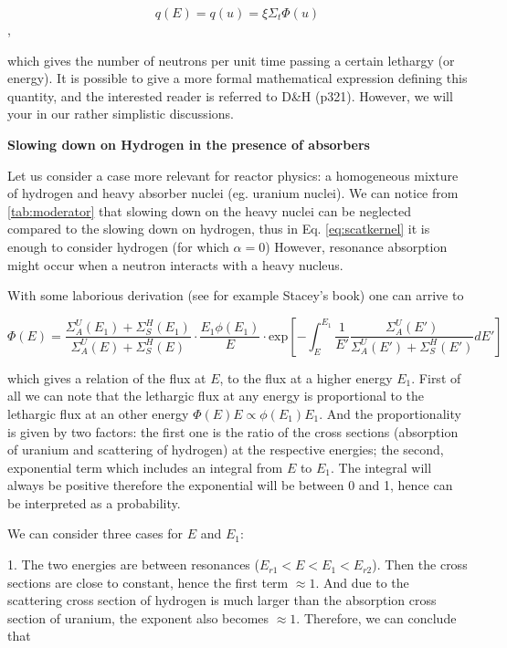 $$q(E)=q(u)=\xi\Sigma_t\Phi(u)$$,

which gives the number of neutrons per unit time passing a certain lethargy (or energy). It is possible to give a more formal mathematical expression defining this quantity, and the interested reader is referred to D\&H (p321). However, we will your in our rather simplistic discussions.


\vspace{0.5cm}

\textbf{Slowing down on Hydrogen in the presence of absorbers}

Let us consider a case more relevant for reactor physics: a homogeneous mixture of hydrogen and heavy absorber nuclei (eg. uranium nuclei). We can notice from \autoref{tab:moderator} that slowing down on the heavy nuclei can be neglected compared to the slowing down on hydrogen, thus in Eq. \eqref{eq:scatkernel} it is enough to consider hydrogen (for which $\alpha=0$) However, resonance absorption might occur when a neutron interacts with a heavy nucleus. 

With some laborious derivation (see for example Stacey's book) one can arrive to

\begin{equation}\label{eq:slowingdownHU}
 \Phi(E) = \frac{\Sigma_A^U(E_1) + \Sigma_S^H(E_1)}{ \Sigma_A^U(E) + \Sigma_S^H(E)} \cdot \frac{E_1\phi(E_1)}{E} \cdot \mathrm{exp}\left[-\int_E^{E_1} \frac{1}{E'} \frac{\Sigma_A^U(E')}{\Sigma_A^U(E') + \Sigma_S^H(E')}dE'\right]
\end{equation}

\noindent which gives a relation of the flux at $E$, to the flux at a higher energy $E_1$. First of all we can note that the lethargic flux at any energy is proportional to the lethargic flux at an other energy $\Phi(E)E \propto \phi(E_1)E_1$. And the proportionality is given by two factors: the first one is the ratio of the cross sections (absorption of uranium and scattering of hydrogen) at the respective energies; the second, exponential term which includes an integral from $E$ to $E_1$. The integral will always be positive therefore the exponential will be between 0 and 1, hence can be interpreted as a probability. 

We can consider three cases for $E$ and $E_1$:

1. The two energies are between resonances ($E_{r1}<E<E_1<E_{r2}$). Then the cross sections are close to constant, hence the first term $\approx 1$. And due to the scattering cross section of hydrogen is much larger than the absorption cross section of uranium, the exponent also becomes $\approx 1$. Therefore, we can conclude that  


